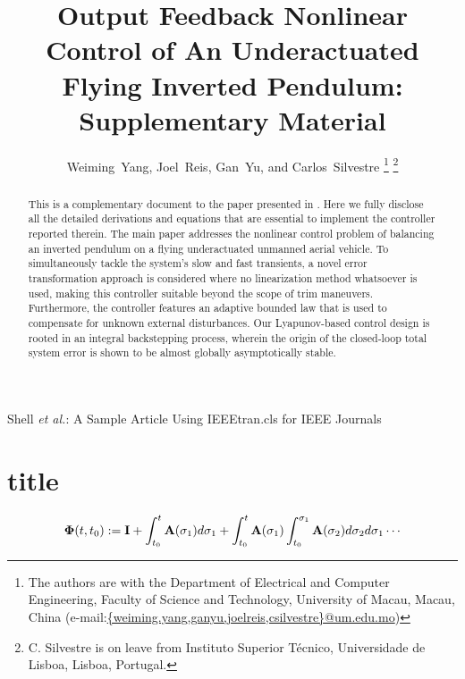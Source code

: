\documentclass[journal,onecolumn]{IEEEtran}
\begin{document}
\title{Output Feedback Nonlinear Control of An Underactuated  Flying Inverted Pendulum: Supplementary Material}

\author{Weiming~Yang,
		Joel~Reis,
        Gan~Yu, and 
        Carlos~Silvestre
    \thanks{The authors are with the Department of Electrical and Computer Engineering, Faculty of Science and Technology, University of Macau, Macau, China (e-mail:\href{mailto:weiming.yang@connect.um.edu.mo}{\{weiming.yang}\href{mailto:ganyu@um.edu.mo}{,ganyu}\href{mailto:joelreis@um.edu.mo}{,joelreis}\href{mailto:csilvestre@um.edu.mo}{,csilvestre\}@um.edu.mo})}%
	\thanks{C. Silvestre is on leave from Instituto Superior Técnico, Universidade de Lisboa, Lisboa, Portugal.}
}

%
{Shell \MakeLowercase{\textit{et al.}}: A Sample Article Using IEEEtran.cls for IEEE Journals}

\maketitle

\begin{abstract}
	This is a complementary document to the paper presented in \cite{2023_Yang_Automatica}.
	Here we fully disclose all the detailed derivations and equations that are essential to implement the controller reported therein.
	The main paper addresses the nonlinear control problem of balancing an inverted pendulum on a flying underactuated unmanned aerial vehicle.
	To simultaneously tackle the system's slow and fast transients, a novel error transformation approach is considered where no linearization method whatsoever is used, making this controller suitable beyond the scope of trim maneuvers.
	Furthermore, the controller features an adaptive bounded law that is used to compensate for unknown external disturbances.
	Our Lyapunov-based control design is rooted in an integral backstepping process, wherein the origin of the closed-loop total system error is shown to be almost globally asymptotically stable.
\end{abstract}

\section{title}

	\begin{align}
	\boldsymbol{\Phi}(t,t_0):= {\mathbf I} + \int_{t_0}^t{\mathbf A}(\sigma_1)d\sigma_1 + \int_{t_0}^t{\mathbf A}(\sigma_1)\int_{t_0}^{\sigma_1}{\mathbf A}(\sigma_2)d\sigma_2d\sigma_1 \cdots
	\label{def:Phi_t_t0}
\end{align}
\end{document}
